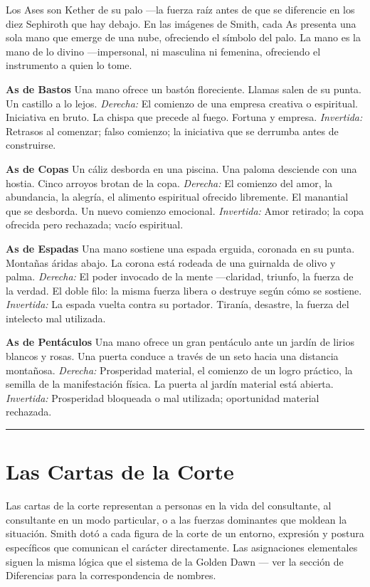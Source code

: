 Los Ases son Kether de su palo ---la fuerza raíz antes de que se diferencie en los diez Sephiroth que hay debajo. En las imágenes de Smith, cada As presenta una sola mano que emerge de una nube, ofreciendo el símbolo del palo. La mano es la mano de lo divino ---impersonal, ni masculina ni femenina, ofreciendo el instrumento a quien lo tome.

\textbf{As de Bastos} Una mano ofrece un bastón floreciente. Llamas salen de su punta. Un castillo a lo lejos. \emph{Derecha:} El comienzo de una empresa creativa o espiritual. Iniciativa en bruto. La chispa que precede al fuego. Fortuna y empresa. \emph{Invertida:} Retrasos al comenzar; falso comienzo; la iniciativa que se derrumba antes de construirse.

\textbf{As de Copas} Un cáliz desborda en una piscina. Una paloma desciende con una hostia. Cinco arroyos brotan de la copa. \emph{Derecha:} El comienzo del amor, la abundancia, la alegría, el alimento espiritual ofrecido libremente. El manantial que se desborda. Un nuevo comienzo emocional. \emph{Invertida:} Amor retirado; la copa ofrecida pero rechazada; vacío espiritual.

\textbf{As de Espadas} Una mano sostiene una espada erguida, coronada en su punta. Montañas áridas abajo. La corona está rodeada de una guirnalda de olivo y palma. \emph{Derecha:} El poder invocado de la mente ---claridad, triunfo, la fuerza de la verdad. El doble filo: la misma fuerza libera o destruye según cómo se sostiene. \emph{Invertida:} La espada vuelta contra su portador. Tiranía, desastre, la fuerza del intelecto mal utilizada.

\textbf{As de Pentáculos} Una mano ofrece un gran pentáculo ante un jardín de lirios blancos y rosas. Una puerta conduce a través de un seto hacia una distancia montañosa. \emph{Derecha:} Prosperidad material, el comienzo de un logro práctico, la semilla de la manifestación física. La puerta al jardín material está abierta. \emph{Invertida:} Prosperidad bloqueada o mal utilizada; oportunidad material rechazada.

\begin{center}\rule{0.5\linewidth}{0.5pt}\end{center}

\section{Las Cartas de la Corte}\label{the-court-cards}

Las cartas de la corte representan a personas en la vida del consultante, al consultante en un modo particular, o a las fuerzas dominantes que moldean la situación. Smith dotó a cada figura de la corte de un entorno, expresión y postura específicos que comunican el carácter directamente. Las asignaciones elementales siguen la misma lógica que el sistema de la Golden Dawn --- ver la sección de Diferencias para la correspondencia de nombres.

